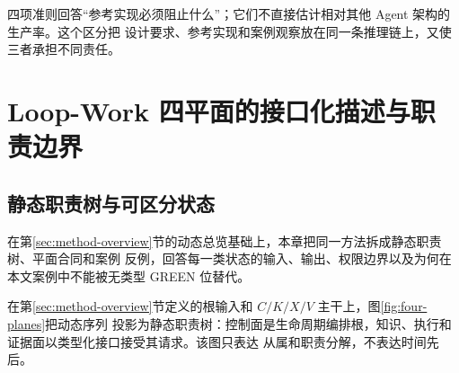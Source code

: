 \documentclass[UTF8,a4paper,zihao=-4,oneside]{ctexart}
\begin{document}
四项准则回答“参考实现必须阻止什么”；它们不直接估计相对其他 Agent 架构的生产率。这个区分把
设计要求、参考实现和案例观察放在同一条推理链上，又使三者承担不同责任。

\section{Loop-Work 四平面的接口化描述与职责边界}
\label{sec:four-plane-detail}

\subsection{静态职责树与可区分状态}

在第\ref{sec:method-overview}节的动态总览基础上，本章把同一方法拆成静态职责树、平面合同和案例
反例，回答每一类状态的输入、输出、权限边界以及为何在本文案例中不能被无类型 GREEN 位替代。

在第\ref{sec:method-overview}节定义的根输入和 $C/K/X/V$ 主干上，图\ref{fig:four-planes}把动态序列
投影为静态职责树：控制面是生命周期编排根，知识、执行和证据面以类型化接口接受其请求。该图只表达
从属和职责分解，不表达时间先后。
\end{document}
